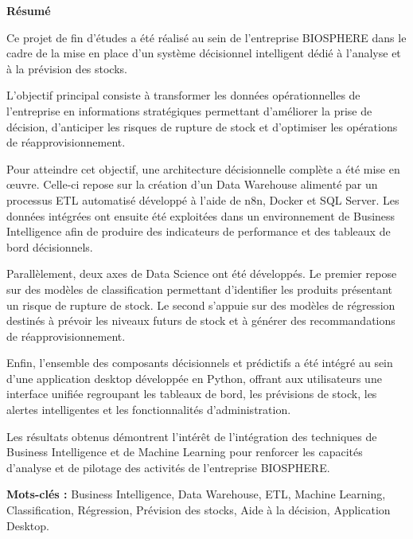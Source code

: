 \begin{singlespace}
\small
\enlargethispage{2cm} %
\setlength{\parskip}{1.5pt}

{}
\begin{center}
    \Large\bfseries Résumé
\end{center}
\vspace{0.1cm}

Ce projet de fin d'études a été réalisé au sein de l'entreprise BIOSPHERE dans le cadre de la mise en place d'un système décisionnel intelligent dédié à l'analyse et à la prévision des stocks.

L'objectif principal consiste à transformer les données opérationnelles de l'entreprise en informations stratégiques permettant d'améliorer la prise de décision, d'anticiper les risques de rupture de stock et d'optimiser les opérations de réapprovisionnement.

Pour atteindre cet objectif, une architecture décisionnelle complète a été mise en œuvre. Celle-ci repose sur la création d'un Data Warehouse alimenté par un processus ETL automatisé développé à l'aide de n8n, Docker et SQL Server. Les données intégrées ont ensuite été exploitées dans un environnement de Business Intelligence afin de produire des indicateurs de performance et des tableaux de bord décisionnels.

Parallèlement, deux axes de Data Science ont été développés. Le premier repose sur des modèles de classification permettant d'identifier les produits présentant un risque de rupture de stock. Le second s'appuie sur des modèles de régression destinés à prévoir les niveaux futurs de stock et à générer des recommandations de réapprovisionnement.

Enfin, l'ensemble des composants décisionnels et prédictifs a été intégré au sein d'une application desktop développée en Python, offrant aux utilisateurs une interface unifiée regroupant les tableaux de bord, les prévisions de stock, les alertes intelligentes et les fonctionnalités d'administration.

Les résultats obtenus démontrent l'intérêt de l'intégration des techniques de Business Intelligence et de Machine Learning pour renforcer les capacités d'analyse et de pilotage des activités de l'entreprise BIOSPHERE.

\vspace{0.2cm}
\noindent\textbf{Mots-clés :} Business Intelligence, Data Warehouse, ETL, Machine Learning, Classification, Régression, Prévision des stocks, Aide à la décision, Application Desktop.


\end{singlespace}
